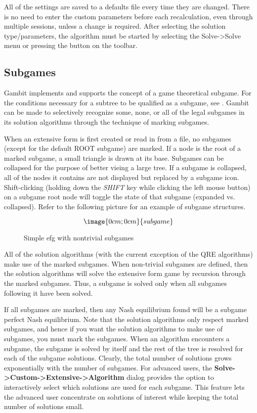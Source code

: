 All of the settings are saved to a defaults file every time they are
changed. There is no need to enter the custom parameters before each
recalculation, even through multiple sessions, unless a change is
required.  After selecting the solution type/parameters, the algorithm
must be started by selecting the Solve->Solve menu or pressing the
button on the toolbar.

\subsection{Subgames}\label{Subgames}
Gambit implements and supports the concept of a game theoretical
subgame. For the conditions necessary for a subtree to be qualified as
a subgame, see \cite{Selten:1975}.  Gambit can be made to selectively
recognize some, none, or all of the legal subgames in its solution
algorithms through the technique of marking subgames.

When an extensive form is first created or read in from a file, no
subgames (except for the default ROOT subgame) are marked.  If a node
is the root of a marked subgame, a small triangle is drawn at its
base.  Subgames can be collapsed for the purpose of better vieing a
large tree.  If a subgame is collapsed, all of the nodes it contains
are not displayed but replaced by a subgame icon.  Shift-clicking
(holding down the {\em SHIFT} key while clicking the left mouse
button) on a subgame root node will toggle the state of that subgame
(expanded vs. collapsed).  Refer to the following picture for an
example of subgame structures.


\begin{figure}
$$\image{0cm;0cm}{subgame}$$
\caption{Simple efg with nontrivial subgames}\label{fig_subgames}
\end{figure}

All of the solution algorithms (with the current exception of the 
QRE algorithms) make use of the marked subgames.  When non-trivial 
subgames are defined, then the solution algorithms will solve the 
extensive form game by recursion through the marked subgames.  Thus, a 
subgame is solved only when all subgames following it have been 
solved.  

If all subgames are marked, then any Nash equilibrium found will be a
subgame perfect Nash equilibrium.  Note that the solution algorithms
only respect marked subgames, and hence if you want the solution
algorithms to make use of subgames, you must mark the subgames.  When
an algorithm encounters a subgame, the subgame is solved by itself and
the rest of the tree is resolved for each of the subgame solutions.
Clearly, the total number of solutions grows exponentially with the
number of subgames.  For advanced users, the {\bf 
Solve->Custom->Extensive->Algorithm} dialog provides the option to
interactively select which solutions are used for each subgame.  This
feature lets the advanced user concentrate on solutions of interest
while keeping the total number of solutions small.

